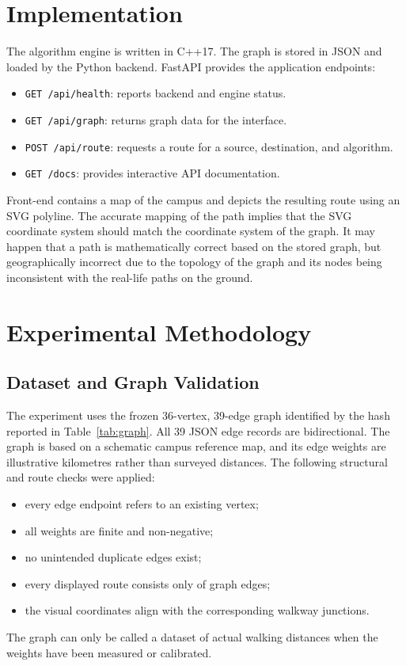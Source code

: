 \documentclass[conference]{IEEEtran}
\begin{document}
\section{Implementation}
The algorithm engine is written in C++17. The graph is stored in JSON and loaded by the Python backend. FastAPI provides the application endpoints:
\begin{itemize}
    \item \texttt{GET /api/health}: reports backend and engine status.
    \item \texttt{GET /api/graph}: returns graph data for the interface.
    \item \texttt{POST /api/route}: requests a route for a source, destination, and algorithm.
    \item \texttt{GET /docs}: provides interactive API documentation.
\end{itemize}

Front-end contains a map of the campus and depicts the resulting route using an SVG polyline. The accurate mapping of the path implies that the SVG coordinate system should match the coordinate system of the graph. It may happen that a path is mathematically correct based on the stored graph, but geographically incorrect due to the topology of the graph and its nodes being inconsistent with the real-life paths on the ground.

\section{Experimental Methodology}
\subsection{Dataset and Graph Validation}
The experiment uses the frozen 36-vertex, 39-edge graph identified by the hash reported in Table~\ref{tab:graph}. All 39 JSON edge records are bidirectional. The graph is based on a schematic campus reference map, and its edge weights are illustrative kilometres rather than surveyed distances. The following structural and route checks were applied:
\begin{itemize}
    \item every edge endpoint refers to an existing vertex;
    \item all weights are finite and non-negative;
    \item no unintended duplicate edges exist;
    \item every displayed route consists only of graph edges;
    \item the visual coordinates align with the corresponding walkway junctions.
\end{itemize}
The graph can only be called a dataset of actual walking distances when the weights have been measured or calibrated.
\end{document}
